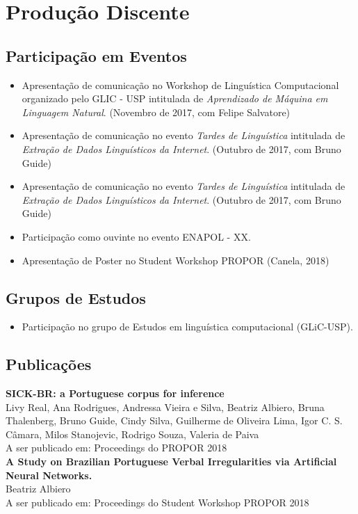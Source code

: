 \chapter{Produção Discente}
\label{ch:02-atividadesacademicas}

\section{Participação em Eventos}
\begin{itemize}
\item Apresentação de comunicação no Workshop de Linguística Computacional organizado pelo GLIC - USP intitulada de \textit{Aprendizado de Máquina em Linguagem Natural}. (Novembro de 2017, com Felipe Salvatore)
\item Apresentação de comunicação no evento \textit{Tardes de Linguística} intitulada de \textit{Extração de Dados Linguísticos da Internet}. (Outubro de 2017, com Bruno Guide)
\item Apresentação de comunicação no evento \textit{Tardes de Linguística} intitulada de \textit{Extração de Dados Linguísticos da Internet}. (Outubro de 2017, com Bruno Guide)
\item Participação como ouvinte no evento ENAPOL - XX.
\item Apresentação de Poster no Student Workshop PROPOR (Canela, 2018)
\end{itemize}

\section{Grupos de Estudos}
\begin{itemize}
\item Participação no grupo de Estudos em linguística computacional (GLiC-USP).
\end{itemize}
\section{Publicações}
\textbf{SICK-BR: a Portuguese corpus for inference}\\

Livy Real, Ana Rodrigues, Andressa Vieira e Silva, Beatriz Albiero, Bruna Thalenberg, Bruno Guide, Cindy Silva, Guilherme de Oliveira Lima, Igor C. S. Câmara, Milos Stanojevic, Rodrigo Souza, Valeria de Paiva\\

A ser publicado em: Proceedings do PROPOR 2018\\

\textbf{A Study on Brazilian Portuguese Verbal Irregularities via Artificial Neural Networks.}\\

Beatriz Albiero\\

A ser publicado em: Proceedings do Student Workshop PROPOR 2018
